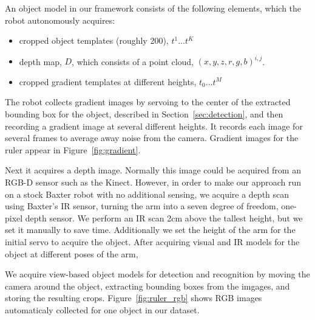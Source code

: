 \documentclass[graybox]{svmult}
\begin{document}
An object model in our framework consists of the following elements,
which the robot autonomously acquires:
\begin{itemize}
\item cropped object templates (roughly 200), $t^1 ... t^K$
\item depth map, $D$, which consists of a point cloud, $(x, y, z, r, g, b)^{i,j}$.
\item cropped gradient templates at different heights, $t_0 ...  t^M$
\end{itemize}

The robot collects gradient images by servoing to the center of the
extracted bounding box for the object, described in
Section~\ref{sec:detection}, and then recording a gradient image at
several different heights.  It records each image for several frames
to average away noise from the camera.  Gradient images for the ruler
appear in Figure~\ref{fig:gradient}.  

Next it acquires a depth image.  Normally this image could be acquired
from an RGB-D sensor such as the Kinect.  However, in order to make
our approach run on a stock Baxter robot with no additional sensing,
we acquire a depth scan using Baxter's IR sensor, turning the arm into
a seven degree of freedom, one-pixel depth sensor.  We perform an IR
scan 2cm above the tallest height, but we set it manually to save
time.  Additionally we set the height of the arm for the initial servo
to acquire the object.  After acquiring visual and IR models for the
object at different poses of the arm,

We acquire view-based object models for detection and recognition by
moving the camera around the object, extracting bounding boxes from
the imgages, and storing the resulting crops.
Figure~\ref{fig:ruler_rgb} shows RGB images automaticaly collected for
one object in our dataset.  
\end{document}
